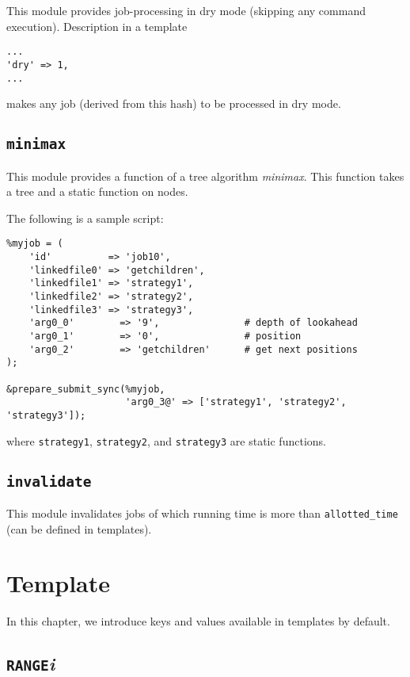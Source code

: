 \documentclass[a4paper,10pt]{report}
\begin{document}
This module provides job-processing in dry mode (skipping any command
execution).  Description in a template
\begin{boxnote}
\begin{verbatim}
...
'dry' => 1,
...
\end{verbatim}
\end{boxnote}
\noindent
makes any job (derived from this hash) to be processed in dry mode.

\section{\texttt{minimax}}

This module provides a function of a tree algorithm \textit{minimax}.
This function takes a tree and a static function on nodes.

The following is a sample script:
\begin{boxnote}
\begin{verbatim}
%myjob = (
    'id'          => 'job10',
    'linkedfile0' => 'getchildren',
    'linkedfile1' => 'strategy1',
    'linkedfile2' => 'strategy2',
    'linkedfile3' => 'strategy3',
    'arg0_0'        => '9',               # depth of lookahead
    'arg0_1'        => '0',               # position
    'arg0_2'        => 'getchildren'      # get next positions
);

&prepare_submit_sync(%myjob,
                     'arg0_3@' => ['strategy1', 'strategy2', 'strategy3']);
\end{verbatim}
\end{boxnote}
\noindent
where \texttt{strategy1}, \texttt{strategy2}, and
\texttt{strategy3} are static functions.

\section{\texttt{invalidate}}

This module invalidates jobs of which running time is more than
\texttt{allotted\_time} (can be defined in templates).

\chapter{Template}\label{chapjobdefhash}

In this chapter, we introduce keys and values available in templates
by default.

\section{\texttt{RANGE}\textit{i}}
\end{document}
